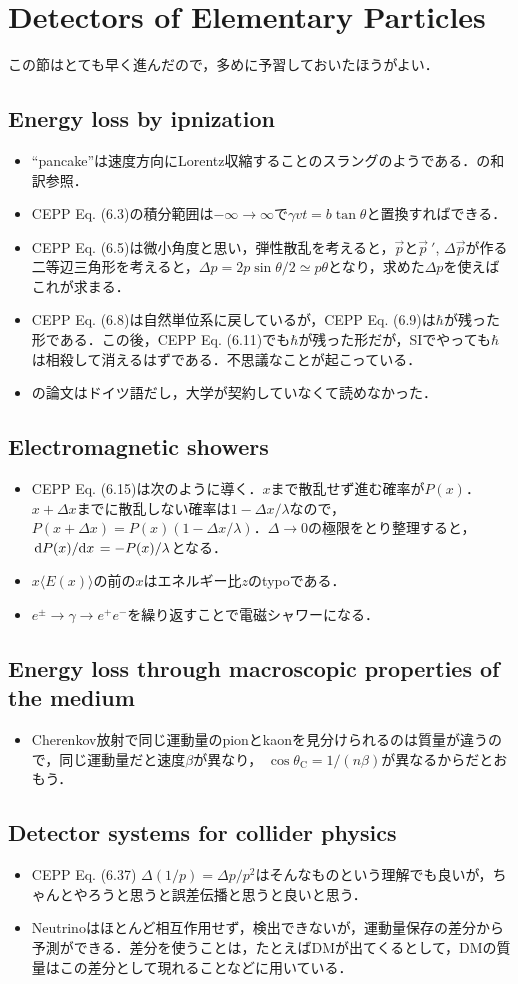 \section{Detectors of Elementary Particles}
この節はとても早く進んだので，多めに予習しておいたほうがよい．
\subsection{Energy loss by ipnization}
\begin{itemize}
		\item ``pancake''は速度方向にLorentz収縮することのスラングのようである．\cite{Pes:2022}の和訳参照．
		\item CEPP Eq. (6.3)の積分範囲は$-\infty \to \infty$で$\gamma vt = b\tan\theta $と置換すればできる．
		\item CEPP Eq. (6.5)は微小角度と思い，弾性散乱を考えると，$\vec{p} $と$\vec{p}\ \!'$, $\varDelta \vec{p} $が作る二等辺三角形を考えると，$\varDelta p = 2p\sin\theta/2\simeq p\theta$となり，求めた$\varDelta p $を使えばこれが求まる．
		\item CEPP Eq. (6.8)は自然単位系に戻しているが，CEPP Eq. (6.9)は$\hbar $が残った形である．この後，CEPP Eq. (6.11)でも$\hbar $が残った形だが，SIでやっても$\hbar $は相殺して消えるはずである．不思議なことが起こっている．
		\item \cite{Bethe1930}の論文はドイツ語だし，大学が契約していなくて読めなかった．
\end{itemize}
\subsection{Electromagnetic showers}
\begin{itemize}
		\item CEPP Eq. (6.15)は次のように導く．$x $まで散乱せず進む確率が$P(x) $．$x + \varDelta x $までに散乱しない確率は$1-\varDelta x /\lambda$なので，$P(x + \varDelta x) = P(x)(1-\varDelta x/\lambda) $．$\varDelta \to 0 $の極限をとり整理すると，$\dv*{P(x)}{x} = -P(x)/\lambda $となる．
		\item $x\langle E(x)\rangle $の前の$x $はエネルギー比$z $のtypoである．
		\item $e^{\pm} \to \gamma \to e^{+}e^{-} $を繰り返すことで電磁シャワーになる．
\end{itemize}
\subsection{Energy loss through macroscopic properties of the medium}
\begin{itemize}
		\item Cherenkov放射で同じ運動量のpionとkaonを見分けられるのは質量が違うので，同じ運動量だと速度$\beta $が異なり，
				$\cos\theta_{\text{C}}= 1/(n\beta) $が異なるからだとおもう．
\end{itemize}
\subsection{Detector systems for collider physics}
\begin{itemize}
		\item CEPP Eq. (6.37) $\varDelta (1/p) = \varDelta p/p^2 $はそんなものという理解でも良いが，ちゃんとやろうと思うと誤差伝播と思うと良いと思う．
		\item Neutrinoはほとんど相互作用せず，検出できないが，運動量保存の差分から予測ができる．差分を使うことは，たとえばDMが出てくるとして，DMの質量はこの差分として現れることなどに用いている．
\end{itemize}
